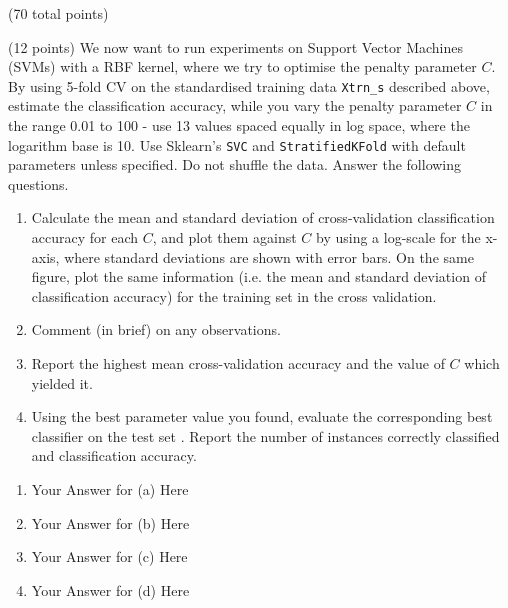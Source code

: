 \documentclass[12pt]{article}
\begin{document}
\begin{question}{(70 total points) \qOneTitle}
\begin{subquestion}{(12 points)
    We now want to run experiments on Support Vector Machines (SVMs) with a RBF kernel, where we try to optimise the penalty parameter $C$.
    By using 5-fold CV on the standardised training data {\tt Xtrn\_s} described above, estimate the classification accuracy, while you vary the penalty parameter $C$ in the range 0.01 to 100 - use 13 values spaced equally in log space, where the logarithm base is 10.
    Use Sklearn's {\tt SVC} and {\tt StratifiedKFold} with default parameters unless specified. Do not shuffle the data.
  } \label{q1:svm}
  Answer the following questions.
  \begin{enumerate}\NARROWITEM
  \item Calculate the mean and standard deviation of cross-validation classification accuracy for each $C$, and plot them against $C$ by using a log-scale for the x-axis, where standard deviations are shown with error bars.
    On the same figure, plot the same information (i.e. the mean and standard deviation of classification accuracy) for the training set in the cross validation.
  \item Comment (in brief) on any observations. 
  \item Report the highest mean cross-validation accuracy and the value of $C$ which yielded it.
  \item Using the best parameter value you found, evaluate the corresponding best classifier on the test set . Report the number of instances correctly classified and classification accuracy.
  \end{enumerate}
   

  \begin{answerbox}{0.65\textheight}
    \begin{enumerate}
    \item Your Answer for (a) Here
    \item Your Answer for (b) Here
    \item Your Answer for (c) Here
    \item Your Answer for (d) Here
    \end{enumerate}
  \end{answerbox}
  


\end{subquestion}


\end{question}
\end{document}
